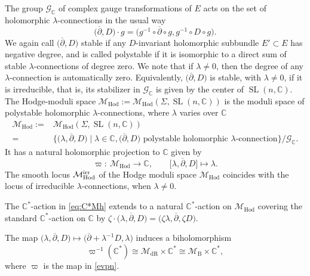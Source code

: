 \documentclass[pdftex]{sigma}
\numberwithin{equation}{section}
\theoremstyle{definition}
\newcommand\C{{\mathbb C}}
\begin{document}
The group $\mathcal G_\C$ of complex gauge transformations of $E$ acts on the set of holomorphic $\lambda$-connections in the usual way
\[
\bigl(\overline{\partial}, D\bigr)\cdot g =
\bigl(g^{-1}\circ \overline{\partial}\circ g , g^{-1} \circ D\circ g\bigr).
\]
We again call $\bigl(\overline{\partial}, D\bigr)$ stable if any $D$-invariant holomorphic subbundle
$E' \subset E$ has negative degree, and  is
called polystable if it is isomorphic to a direct sum of stable $\lambda$-connections
of degree zero. We note that if $\lambda \not= 0$, then the degree of any $\lambda$-connection
is automatically zero. Equivalently, $\bigl(\overline{\partial}, D\bigr)$ is stable, with $\lambda \not= 0$, if it is
irreducible, that is, its stabilizer in $\mathcal G_\C$ is given by the center of $\operatorname{SL}(n, \C)$.
The Hodge-moduli space $\mathcal{M}_{\mathrm{Hod}} := \mathcal{M}_{\mathrm{Hod}}(\Sigma, \operatorname{SL}(n,\C))$ is the moduli space of
polystable holomorphic $\lambda$-connections, where $\lambda$ varies over $\C$
\begin{align*}%
\mathcal{M}_{\mathrm{Hod}} :={}& \mathcal{M}_{\mathrm{Hod}}(\Sigma, \operatorname{SL}(n, \C)) \\={}&
\bigl\{\bigl(\lambda, \overline{\partial}, D\bigr) \mid \lambda \in \C,
\text{$\bigl(\overline{\partial}, D\bigr)$ polystable holomorphic $\lambda$-connection}\}/\mathcal G_\C.
\end{align*}
It has a natural holomorphic projection to $\C$ given by
\begin{equation}\label{evpn}
\varpi\colon\ \mathcal{M}_{\mathrm{Hod}} \longrightarrow \C,\qquad \big[\lambda , {\overline{\partial}}, D \big] \longmapsto \lambda.
\end{equation}
The smooth locus $\mathcal{M}_{\mathrm{Hod}}^{\rm irr}$ of the Hodge moduli space $\mathcal{M}_{\mathrm{Hod}}$
coincides with the locus of irreducible $\lambda$-connections, when $\lambda \not= 0$.

The $\C^*$-action in \eqref{eq:C*Mh} extends to a natural $\C^*$-action on $\mathcal{M}_{\mathrm{Hod}}$ covering the standard $\C^*$-action on $\C$ by
$%
\zeta\cdot\bigl(\lambda, \overline{\partial}, D\bigr) = \bigl(\zeta\lambda, \overline{\partial}, \zeta D\bigr)$.

The map $\bigl(\lambda, \overline{\partial}, D\bigr) \longmapsto \bigl(\overline{\partial} + \lambda^{-1}D,
 \lambda\bigr)$ induces a biholomorphism
\[
\varpi^{-1}(\C^*) \cong \mathcal{M}_{\mathrm{dR}} \times\C^* \cong \mathcal{M}_{\mathrm{B}} \times\C^*,
\]
where $\varpi$ is the map in \eqref{evpn}.
\end{document}
